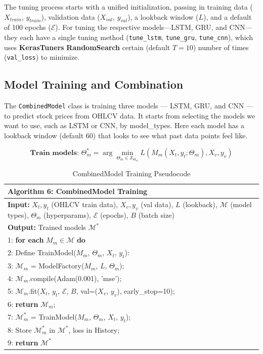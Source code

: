 The tuning process starts with a unified initialization, passing in training data ($X_{train}$, $y_{train}$), validation data  ($X_{val}$, $y_{val}$), a lookback window ($L$), and a default of 100 epochs ($\mathcal{E}$). For tuning the respective models—LSTM, GRU, and CNN—they each have a single tuning method  (\texttt{tune\_lstm}, \texttt{tune\_gru}, \texttt{tune\_cnn}), which uses \textbf{KerasTuners} \textbf{RandomSearch} certain  (default $T = 10$) number of times (\texttt{val\_loss}) to minimize.

\subsection{Model Training and Combination}

The \texttt{CombinedModel} class is training three models — LSTM, GRU, and CNN — to predict stock prices from OHLCV data. It starts from selecting the models we want to use, such as LSTM or CNN, by model\_types. Here each model has a lookback window (default 60) that looks to see what past data points feel like. 

\begin{equation}
\textbf{Train models: }\Theta_m^* = \arg\min_{\Theta_m \in \mathcal{S}_{\Theta_m}} L(M_m(X_t, y_t; \Theta_m), X_v, y_v)
\label{math_dl_train_models}
\end{equation}

\begin{table}[h]
\small
\centering
\begin{tabular}{|p{10cm}|}
\hline
\textbf{Algorithm 6: CombinedModel Training} \\
\hline
\textbf{Input:} $X_t, y_t$ (OHLCV train data), $X_v, y_v$ (val data), $L$ (lookback), $\mathcal{M}$ (model types), $\Theta_m$ (hyperparams), $\mathcal{E}$ (epochs), $B$ (batch size) \\
\textbf{Output:} Trained models $\mathcal{M}^*$ \\
\hline
1: \textbf{for each} $M_m \in \mathcal{M}$ \textbf{do} \\
2: \quad Define TrainModel($M_m$, $\Theta_m$, $X_t$, $y_t$): \\
3: \quad\quad $\mathcal{M}_m$ = ModelFactory($M_m$, $L$, $\Theta_m$); \\
4: \quad\quad $\mathcal{M}_m$.compile(Adam(0.001), 'mse'); \\
5: \quad\quad $\mathcal{M}_m$.fit($X_t$, $y_t$, $\mathcal{E}$, $B$, val=($X_v$, $y_v$), early\_stop=10); \\
6: \quad\quad \textbf{return} $\mathcal{M}_m$; \\
7: \quad $\mathcal{M}_m^*$ = TrainModel($M_m$, $\Theta_m$, $X_t$, $y_t$); \\
8: \quad Store $\mathcal{M}_m^*$ in $\mathcal{M}^*$, loss in History; \\
9: \textbf{return} $\mathcal{M}^*$ \\
\hline
\end{tabular}
\caption{CombinedModel Training Pseudocode}
\label{tab:combined_dl_model_train}
\end{table}

